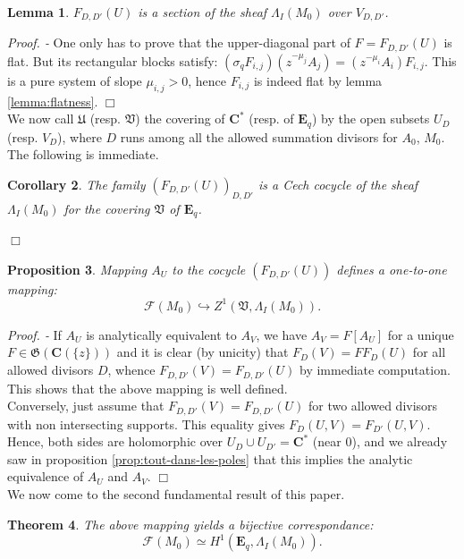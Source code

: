 \documentclass[english]{smfart}
\newtheorem{thm}{Theorem}[section]
\newtheorem{lemma}[thm]{Lemma}
\newtheorem{prop}[thm]{Proposition}
\newtheorem{cor}[thm]{Corollary}
\numberwithin{equation}{thm}
\def \Pr {\textsl{Proof. - }}
\def\sq{\sigma_q}
\def\C{{\mathbf C}}
\def\F{{\mathcal{F}}}
\def\Eq{{\mathbf{E}_{q}}}
\def\G{{\mathfrak{G}}}
\def\U{{\mathfrak{U}}}
\def\V{{\mathfrak{V}}}
\def\Ka{{\C(\{z\})}}
\def\l{\left}
\def\r{\right}
\def\La{\Lambda}
\begin{document}
\begin{lemma}
$F_{D,D'}(U)$ is a section of the sheaf $\La_{I}(M_{0})$ over $V_{D,D'}$.
\end{lemma}

\Pr 
One only has to prove that the upper-diagonal part of $F = F_{D,D'}(U)$
is flat. But its rectangular blocks satisfy:
$\l(\sq F_{i,j}\r) (z^{-\mu_{j}} A_{j}) = 
(z^{-\mu_{i}} A_{i}) F_{i,j}$.
This is a pure system of slope $\mu_{i,j} > 0$, hence $F_{i,j}$ 
is indeed flat by lemma \ref{lemma:flatness}.
\hfill $\Box$ \\

We now call $\U$ (resp. $\V$) the covering of $\C^{*}$ (resp. 
of $\Eq$) by the open subsets $U_{D}$ (resp. $V_{D}$), where 
$D$ runs among all the allowed summation divisors for $A_{0}$, 
$M_{0}$. The following is immediate.

\begin{cor}
The family $(F_{D,D'}(U))_{D,D'}$ is a Cech cocycle of the sheaf 
$\La_{I}(M_{0})$
for the covering $\V$ of $\Eq$.
\end{cor}

\hfill $\Box$

\begin{prop} \label{prop:cocycles-privilegies}
Mapping $A_{U}$ to the cocycle $(F_{D,D'}(U))$ defines a one-to-one
mapping:
$$
\F(M_{0}) \hookrightarrow Z^{1}(\V,\La_{I}(M_{0})).
$$
\end{prop}

\Pr
If $A_{U}$ is analytically equivalent to $A_{V}$, we have 
$A_{V} = F[A_{U}]$ for a unique $F \in \G(\Ka)$ and it is
clear (by unicity) that $F_{D}(V) = F F_{D}(U)$ for all
allowed divisors $D$, whence $F_{D,D'}(V) = F_{D,D'}(U)$
by immediate computation. This shows that the above mapping
is well defined. \\

Conversely, just assume that $F_{D,D'}(V) = F_{D,D'}(U)$
for two allowed divisors with non intersecting supports.
This equality gives $F_{D}(U,V) = F_{D'}(U,V)$. Hence, 
both sides are holomorphic over $U_{D} \cup U_{D'} = \C^{*}$
(near $0$), and we already saw in proposition \ref{prop:tout-dans-les-poles} 
that this implies the analytic equivalence of $A_{U}$ and $A_{V}$.
\hfill $\Box$ \\

We now come to the second fundamental result of this paper.

\begin{thm} \label{thm:q-Malgrange-Sibuya}
The above mapping yields a bijective correspondance:
$$
\F(M_{0}) \simeq H^{1}(\Eq,\La_{I}(M_{0})).
$$
\end{thm}
\end{document}
